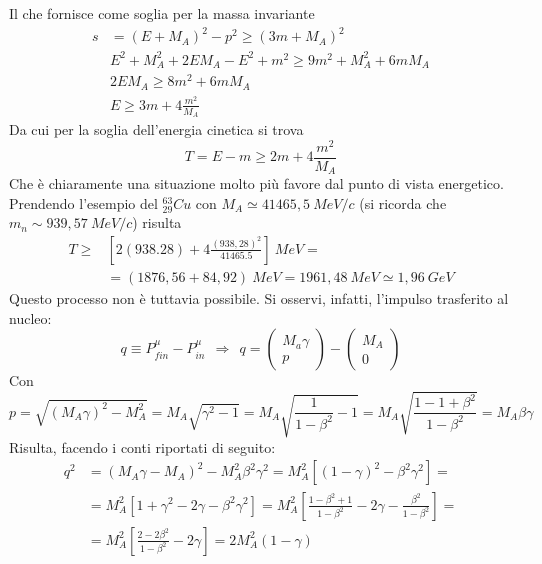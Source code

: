 \documentclass[twoside]{article}
\begin{document}
Il che fornisce come soglia per la massa invariante
\begin{align}
    s&=(E+M_A)^2-p^2\geq (3m+M_A)^2 \\
    &E^2+M_A^2+2EM_A-E^2+m^2 \geq 9m^2+M_A^2+6mM_A \\
    &2EM_A \geq 8m^2+6mM_A \\
    &E\geq 3m + 4 \frac{m^2}{M_A}\label{5.29}
\end{align}
Da cui per la soglia dell'energia cinetica si trova
\begin{equation}
    T=E-m\geq 2m + 4 \frac{m^2}{M_A}
\end{equation}
Che è chiaramente una situazione molto più favore dal punto di vista energetico.
\\
Prendendo l'esempio del ${}^{63}_{29}Cu$ con $M_A \simeq 41465,5 \ MeV/c $ (si ricorda che $m_n\sim 939,57 \ MeV/c$) risulta
\begin{align}
    T\geq & \left[2(938.28)+4\frac{(938,28)^2}{41465.5}\right] \ MeV = \\
    & = (1876,56 + 84,92) \ MeV = 1961,48 \ MeV \simeq 1,96 \ GeV
\end{align}
Questo processo non è tuttavia possibile. Si osservi, infatti, l'impulso trasferito al nucleo:
\begin{equation*}
q\equiv P^\mu _{fin}-P^\mu_{in} \ \ \Rightarrow \ \ q= \left( \begin{array}{lr}
     M_a \gamma  \\
     p 
\end{array}\right) -\left( \begin{array}{lr}
     M_A  \\
     0
\end{array}\right)
\end{equation*}
Con 
\begin{equation*}
    p=\sqrt{(M_A\gamma)^2-M_A^2}=M_A\sqrt{\gamma^2-1}=M_A\sqrt{\frac{1}{1-\beta^2}-1}=M_A\sqrt{\frac{1-1+\beta^2}{1-\beta^2}}=M_A\beta \gamma
\end{equation*}
Risulta, facendo i conti riportati di seguito:
\begin{align}
    q^2&= (M_A\gamma-M_A)^2-M_A^2\beta^2\gamma^2 = M_A^2[(1-\gamma)^2-\beta^2\gamma^2]=\\
    &=M_A^2[1+\gamma^2-2\gamma -\beta^2 \gamma^2]=M_A^2\left[ \frac{1-\beta^2+1}{1-\beta^2}-2\gamma -\frac{\beta^2}{1-\beta^2}\right]= \\
    &=M_A^2\left[ \frac{2-2\beta^2}{1-\beta^2}-2\gamma \right]=2 M_A^2(1-\gamma)
\end{align}
\end{document}
